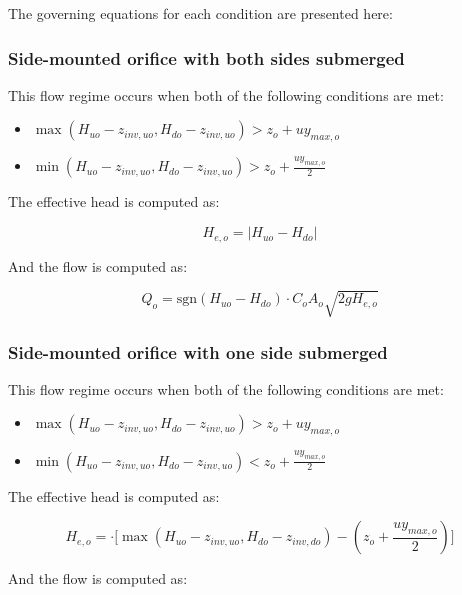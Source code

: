 \documentclass[11pt]{article}
\begin{document}
The governing equations for each condition are presented here:

\subsubsection*{Side-mounted orifice with both sides submerged}

This flow regime occurs when both of the following conditions are met:

\begin{itemize}
\item $\max(H_{uo} - z_{inv,uo}, H_{do} - z_{inv,uo}) > z_o + u y_{max,o}$
\item $\min(H_{uo} - z_{inv,uo}, H_{do} - z_{inv,uo}) > z_o + \frac{u y_{max,o}}{2}$
\end{itemize}

The effective head is computed as:

\begin{equation}
  H_{e,o} = | H_{uo} - H_{do} |
\end{equation}

And the flow is computed as:

\begin{equation}
 Q_o = \text{sgn}(H_{uo} - H_{do}) \cdot C_o A_o \sqrt{2 g H_{e,o}} 
\end{equation}

\subsubsection*{Side-mounted orifice with one side submerged}

This flow regime occurs when both of the following conditions are met:

\begin{itemize}
\item $\max(H_{uo} - z_{inv,uo}, H_{do} - z_{inv,uo}) > z_o + u y_{max,o}$
\item $\min(H_{uo} - z_{inv,uo}, H_{do} - z_{inv,uo}) < z_o + \frac{u y_{max,o}}{2}$
\end{itemize}

The effective head is computed as:

\begin{equation}
  H_{e,o} = \cdot \bigl[ \max(H_{uo} - z_{inv,uo}, H_{do} - z_{inv,do}) - (z_o + \frac{u y_{max,o}}{2}) \bigr]
\end{equation}

And the flow is computed as:
\end{document}
